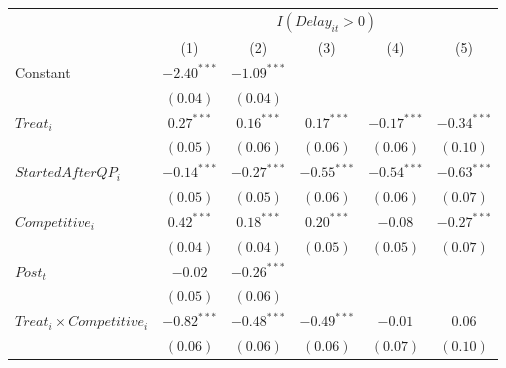 \documentclass[
]{article}
\begin{document}
\begin{table}
\begin{center}
\begin{tabular}{l c c c c c}
\hline
 & \multicolumn{5}{c}{$I(Delay_{it}>0)$} \\
\cline{2-6}
 & (1) & (2) & (3) & (4) & (5) \\
\hline
Constant                                                             & $-2.40^{***}$ & $-1.09^{***}$ &               &               &               \\
                                                                     & $(0.04)$      & $(0.04)$      &               &               &               \\
$Treat_i$                                                            & $0.27^{***}$  & $0.16^{***}$  & $0.17^{***}$  & $-0.17^{***}$ & $-0.34^{***}$ \\
                                                                     & $(0.05)$      & $(0.06)$      & $(0.06)$      & $(0.06)$      & $(0.10)$      \\
$StartedAfterQP_i$                                                   & $-0.14^{***}$ & $-0.27^{***}$ & $-0.55^{***}$ & $-0.54^{***}$ & $-0.63^{***}$ \\
                                                                     & $(0.05)$      & $(0.05)$      & $(0.06)$      & $(0.06)$      & $(0.07)$      \\
$Competitive_i$                                                      & $0.42^{***}$  & $0.18^{***}$  & $0.20^{***}$  & $-0.08$       & $-0.27^{***}$ \\
                                                                     & $(0.04)$      & $(0.04)$      & $(0.05)$      & $(0.05)$      & $(0.07)$      \\
$Post_t$                                                             & $-0.02$       & $-0.26^{***}$ &               &               &               \\
                                                                     & $(0.05)$      & $(0.06)$      &               &               &               \\
$Treat_i \times Competitive_i$                                       & $-0.82^{***}$ & $-0.48^{***}$ & $-0.49^{***}$ & $-0.01$       & $0.06$        \\
                                                                     & $(0.06)$      & $(0.06)$      & $(0.06)$      & $(0.07)$      & $(0.10)$      \\

\end{tabular}
\end{center}
\end{table}
\end{document}
